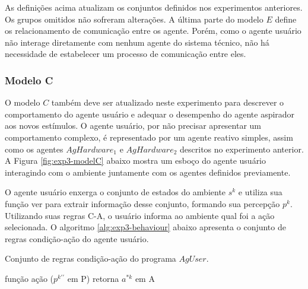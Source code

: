 As definições acima atualizam os conjuntos definidos nos experimentos anteriores. Os grupos omitidos não sofreram alterações. A última parte do modelo $E$ define os relacionamento de comunicação entre os agente. Porém, como o agente usuário não interage diretamente com nenhum agente do sistema técnico, não há necessidade de estabelecer um processo de comunicação entre eles. 

\subsubsection{Modelo C}

O modelo $C$ também deve ser atualizado neste experimento para descrever o comportamento do agente usuário e adequar o desempenho do agente aspirador aos novos estímulos. O agente usuário, por não precisar apresentar um comportamento complexo, é representado por um agente reativo simples, assim como os agentes $AgHardware_1$ e $AgHardware_2$ descritos no experimento anterior.  A Figura \ref{fig:exp3-modelC} abaixo mostra um esboço do agente usuário interagindo com o ambiente juntamente com os agentes definidos previamente.

\begin{figure}[h!]
    \centering
\end{figure}

O agente usuário enxerga o conjunto de estados do ambiente $s^k$ e utiliza sua função ver para extrair informação desse conjunto, formando sua percepção $p^k$. Utilizando suas regras C-A, o usuário informa ao ambiente qual foi a ação selecionada. O algoritmo \ref{alg:exp3-behaviour} abaixo apresenta o conjunto de regras condição-ação do agente usuário. 

\begin{algorithm}[h!]
    \caption{\label{alg:exp3-behaviour} Conjunto de regras condição-ação do programa $AgUser$.}
    função ação ($p^{k\prime\prime}$ em P) retorna $a^{*k}$ em A\\
\end{algorithm}

